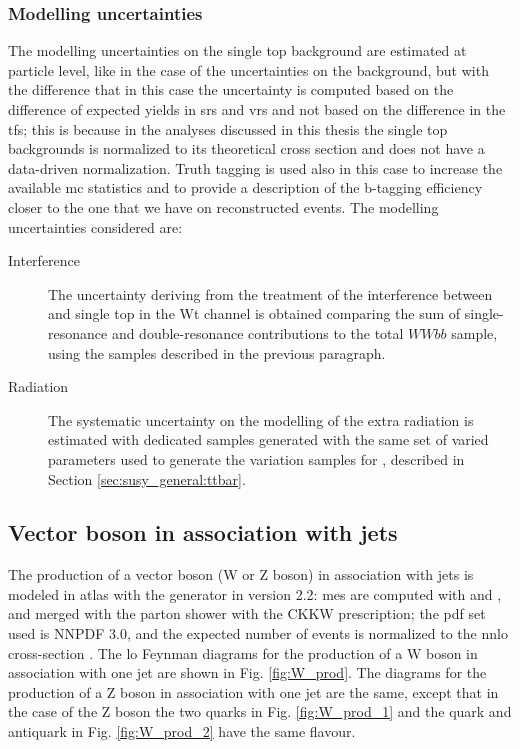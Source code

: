 \subsubsection*{Modelling uncertainties}

The modelling uncertainties on the single top background are estimated at particle level, 
like in the case of the uncertainties on the \ttbar background, but with the difference that in this case the uncertainty is computed based on the difference of expected yields in \glspl{sr} and \glspl{vr} and not based on the difference in the \glspl{tf}; 
this is because in the analyses discussed in this thesis the single top backgrounds is normalized to its theoretical cross section and does not have a data-driven normalization. Truth tagging is used also in this case to increase the available \gls{mc} statistics and to provide a description of the b-tagging efficiency closer to the one that we have on reconstructed events. The modelling uncertainties considered are: 

\begin{description}
\item[Interference] The uncertainty deriving from the treatment of the interference between \ttbar and single top in the Wt channel is obtained comparing the sum of single-resonance and double-resonance contributions to the total $WWbb$ sample, using the samples described in the previous paragraph.

\item[Radiation] The systematic uncertainty on the modelling of the extra radiation is estimated with dedicated samples generated with the same set of varied parameters used to generate the variation samples for \ttbar, described in Section \ref{sec:susy_general:ttbar}. 

\end{description}

\subsection{Vector boson in association with jets}

The production of a vector boson (W or Z boson) in association with jets is modeled in \gls{atlas} with the \Sherpa generator in version 2.2: \glspl{me} are 
computed with \comix \cite{Gleisberg:2008fv} and \OL \cite{Cascioli:2011va}, and merged with the \Sherpa parton shower with the CKKW prescription; the \gls{pdf} set used is NNPDF 3.0, and the expected number of events is normalized to the \gls{nnlo} cross-section \cite{Catani:2009sm}.
The \gls{lo} Feynman diagrams for the production of a W boson in association with one jet are shown in Fig. \ref{fig:W_prod}. 
The diagrams for the production of a Z boson in association with one jet are the same, except that in the case of the Z boson the 
two quarks in Fig. \ref{fig:W_prod_1} and the quark and antiquark in Fig. \ref{fig:W_prod_2} have the same flavour. 

